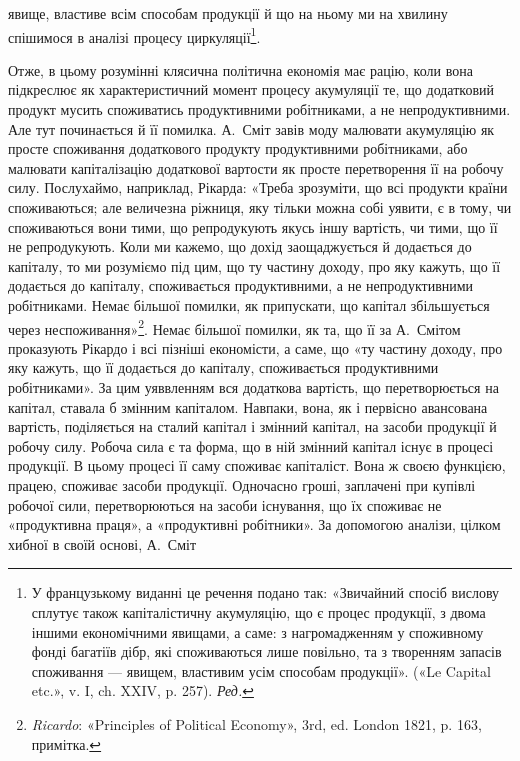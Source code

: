 \parcont{}  %
явище, властиве всім способам продукції й що на ньому ми на
хвилину спішимося в аналізі процесу циркуляції\footnote*{
У французькому виданні це речення подано так: «Звичайний спосіб
вислову сплутує також капіталістичну акумуляцію, що є процес
продукції, з двома іншими економічними явищами, а саме: з нагромадженням
у споживному фонді багатіїв дібр, які споживаються лише
повільно, та з творенням запасів споживання — явищем, властивим усім
способам продукції». («Le Capital etc.», v. I, ch. XXIV, p. 257). \emph{Ред.}
}.

Отже, в цьому розумінні клясична політична економія має
рацію, коли вона підкреслює як характеристичний момент процесу
акумуляції те, що додатковий продукт мусить споживатись
продуктивними робітниками, а не непродуктивними. Але тут починається
й її помилка. А.~Сміт завів моду малювати акумуляцію як
просте споживання додаткового продукту продуктивними робітниками,
або малювати капіталізацію додаткової вартости як просте
перетворення її на робочу силу. Послухаймо, наприклад, Рікарда:
«Треба зрозуміти, що всі продукти країни споживаються; але величезна
ріжниця, яку тільки можна собі уявити, є в тому, чи споживаються
вони тими, що репродукують якусь іншу вартість, чи тими,
що її не репродукують. Коли ми кажемо, що дохід заощаджується
й додається до капіталу, то ми розуміємо під цим, що ту частину
доходу, про яку кажуть, що її додається до капіталу, споживається
продуктивними, а не непродуктивними робітниками. Немає
більшої помилки, як припускати, що капітал збільшується через
неспоживання»\footnote{
\emph{Ricardo}: «Principles of Political Economy», 3rd, ed. London
1821, p. 163, примітка.
}. Немає більшої помилки, як та, що її за
А.~Смітом проказують Рікардо і всі пізніші економісти, а саме,
що «ту частину доходу, про яку кажуть, що її додається до капіталу,
споживається продуктивними робітниками». За цим уяввленням
вся додаткова вартість, що перетворюється на капітал,
ставала б змінним капіталом. Навпаки, вона, як і первісно авансована
вартість, поділяється на сталий капітал і змінний капітал,
на засоби продукції й робочу силу. Робоча сила є та форма, що
в ній змінний капітал існує в процесі продукції. В цьому процесі
її саму споживає капіталіст. Вона ж своєю функцією, працею,
споживає засоби продукції. Одночасно гроші, заплачені при
купівлі робочої сили, перетворюються на засоби існування, що
їх споживає не «продуктивна праця», а «продуктивні робітники».
За допомогою аналізи, цілком хибної в своїй основі, А.~Сміт
